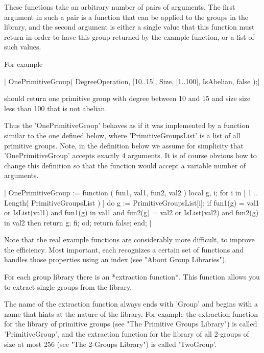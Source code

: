 These  functions take an  arbitrary number of  pairs of  arguments.   The
first argument in such a pair  is a function  that can  be applied to the
groups in the library,  and the second  argument is either a single value
that this  function must return in  order  to have this group returned by
the example function, or a list of such values.

For example

|    OnePrimitiveGroup( DegreeOperation,  [10..15],
                        Size,             [1..100],
                        IsAbelian,        false    );|

should return one primitive group  with degree between 10 and 15 and size
size less than 100 that is not abelian.

Thus  the 'OnePrimitiveGroup'  behaves  as  if it  was  implemented by  a
function similar to the one defined below, where 'PrimitiveGroupsList' is
a list of all primitive groups.   Note, in the definition below we assume
for simplicity that 'OnePrimitiveGroup'  accepts exactly 4 arguments.  It
is of course obvious how to change  this  definition so that the function
would accept a variable number of arguments.

|    OnePrimitiveGroup := function ( fun1, val1, fun2, val2 )
        local    g, i;
        for i  in [ 1 .. Length( PrimitiveGroupsList ) ] do
            g := PrimitiveGroupsList[i];
            if      fun1(g) = val1  or IsList(val1) and fun1(g) in val1
                and fun2(g) = val2  or IsList(val2) and fun2(g) in val2
            then
                return g;
            fi;
        od;
        return false;
    end; |

Note that the real example functions are  considerably more difficult, to
improve the efficiency.  Most important, each recognizes a certain set of
functions and handles those properties using an  index (see "About  Group
Libraries").


For each group library there is an *extraction function*.  This function
allows you to extract single groups from the library.

The  name of the extraction function always ends with 'Group'  and begins
with a name that hints at  the  nature  of the  library.  For example the
extraction  function  for  the library  of  primitive  groups  (see  "The
Primitive Groups Library") is called 'PrimitiveGroup', and the extraction
function for  the library of all 2-groups  of size at most 256  (see "The
2-Groups Library") is called 'TwoGroup'.

